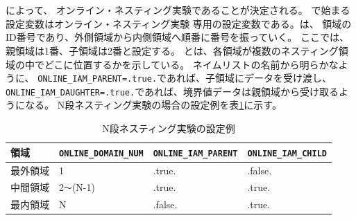 \vspace{0.5cm}

\\
{\small {\gt
{}}}\\

\noindent 
{}によって、
オンライン・ネスティング実験であることが決定される。
で始まる設定変数はオンライン・ネスティング実験
専用の設定変数である。は、
領域のID番号であり、外側領域から内側領域へ順番に番号を振っていく。
ここでは、親領域は1番、子領域は2番と設定する。
とは、各領域が複数のネスティング領域の中でどこに位置するかを示している。
ネイムリストの名前から明らかなように、
\verb|ONLINE_IAM_PARENT=.true.|であれば、子領域にデータを受け渡し、
\verb|ONLINE_IAM_DAUGHTER=.true.|であれば、境界値データは親領域から受け取るようになる。
N段ネスティング実験の場合の設定例を表\ref{tab:triple_nested}に示す。

\begin{table}[htb]
\begin{center}
\caption{N段ネスティング実験の設定例}
\begin{tabularx}{145mm}{|l|l|l|X|} \hline
 \rowcolor[gray]{0.9} 領域 & \verb|ONLINE_DOMAIN_NUM| & \verb|ONLINE_IAM_PARENT| & \verb|ONLINE_IAM_CHILD|\\ \hline
 最外領域 & 1               & .true.  & .false. \\ \hline
 中間領域 & 2\verb|〜|(N-1) & .true.  & .true. \\ \hline
 最内領域 & N               & .false. & .true. \\ \hline
\end{tabularx}
\label{tab:triple_nested}
\end{center}
\end{table}

